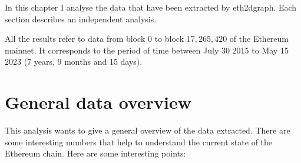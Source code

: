 In this chapter I analyse the data that have been extracted by eth2dgraph. Each section describes an independent analysis.

All the results refer to data from block $0$ to block $17,265,420$ of the Ethereum mainnet. It corresponds to the period of time between July 30 2015 to May 15 2023 (7 years, 9 months and 15 days).

\section{General data overview}

This analysis wants to give a general overview of the data extracted. There are some interesting numbers that help to understand the current state of the Ethereum chain. Here are some interesting points:


